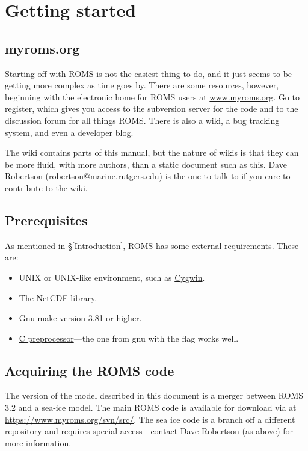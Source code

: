 \section{Getting started}
\label{Starting}

\subsection{myroms.org}
\label{Svn}
Starting off with ROMS is not the easiest thing to do, and it just
seems to be getting more complex as time goes by. There are
some resources, however, beginning with the
electronic home for ROMS users at
\href{http://www.myroms.org}{www.myroms.org}. Go to register,
which gives you access to the subversion server for the code and to
the  discussion forum for all things ROMS. There is also a wiki,
a bug tracking system, and even a developer blog.

The wiki contains parts of this manual, but the nature of wikis is that
they can be more fluid, with more authors, than a static document such
as this. Dave Robertson (robertson@marine.rutgers.edu) is the one to
talk to if you care to contribute to the wiki.

\subsection{Prerequisites}
As mentioned in \S\ref{Introduction}, ROMS has some external
requirements. These are:
\begin{itemize}
    \item UNIX or UNIX-like environment, such as
    \href{http://www.redhat.com/services/custom/cygwin/}{Cygwin}.
    \item The
    \href{http://www.unidata.ucar.edu/software/netcdf/index.html}{NetCDF
    library}.
    \item \href{http://www.gnu.org/software/make/}{Gnu make} version
    3.81 or higher.
    \item \href{http://en.wikipedia.org/wiki/C_preprocessor}{C
    preprocessor}---the one from gnu with the 
    flag works well.
\end{itemize}
\subsection{Acquiring the ROMS code}
The version of the model described in this document is a merger between
ROMS 3.2 and a sea-ice model. The main ROMS code is available for
download via  at
\href{https://www.myroms.org/svn/src/}{https://www.myroms.org/svn/src/}.
The sea ice code is a branch off a different repository and requires
special access---contact Dave Robertson (as above) for more information.

